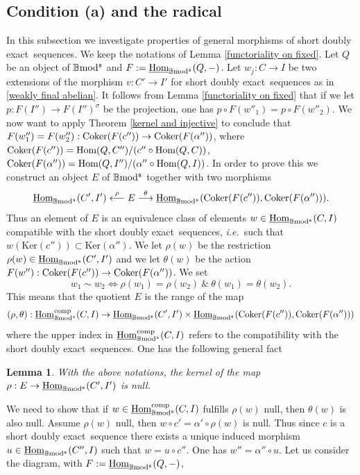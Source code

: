 \documentclass[12pt]{article}
\newtheorem{lem}[thm]{Lemma}
\def\Hom{{\rm Hom}}
\def\Homi{{\underline{\rm Hom}}}
\def\coker{{\rm Coker}}
\def\B{{\mathbb B}}
\def\exxx{{doubly exact}~}
\newcommand{\ie}{{\it i.e.\/}\ }
\def\ker{{\mbox{Ker}}}
\def\Hom {{\mbox{Hom}}}
\def\b2{{\rm \B mod^{\mathfrak s}}}
\begin{document}
\subsection{Condition (a) and the radical}\label{sect a and radical}
 In this subsection we investigate  properties of general morphisms of short \exxx sequences.
We keep the notations of Lemma \ref{functoriality on fixed}.
Let $Q$ be an object of $\b2$ and $F:=\Homi_\b2(Q,-)$.	Let $w_j:C\to I$ be two extensions  of the morphism $v:C'\to I'$ for short \exxx sequences as in \eqref{weakly final abelian}.  It follows from Lemma \ref{functoriality on fixed} that if we let $p:F(I'')\to F(I'')^\sigma$ be the projection, one has  $p\circ F(w''_1)=p\circ F(w''_2)$. We now want to apply Theorem \ref{kernel and injective} to conclude that 
$F(w''_1)=F(w''_2): \coker(F(c''))\to \coker(F(\alpha''))$, where 
$
\coker(F(c''))=\Hom(Q,C'')/(c''\circ \Hom(Q,C))$,  
$\coker(F(\alpha''))=\Hom(Q,I'')/(\alpha''\circ \Hom(Q,I))$. In order to prove this we construct an object $E$ of $\b2$ together with two morphisms 
$$
\Homi_\b2(C',I')\stackrel{\rho}{\longleftarrow} E\stackrel{\theta}{\longrightarrow}
\Homi_\b2(\coker(F(c'')),\coker(F(\alpha''))).
$$
Thus an element of $E$ is an equivalence class of elements $w\in \Homi_\b2(C,I)$ compatible with the short \exxx sequences, \ie such that $w(\ker(c''))\subset \ker(\alpha'')$. We let $\rho(w)$ be the restriction $\rho(w)\in \Homi_\b2(C',I')$ and we let $\theta(w)$ be the action $F(w''): \coker(F(c''))\to \coker(F(\alpha''))$. We set
$$
w_1\sim w_2\iff \rho(w_1)=\rho(w_2)\ \& \ \theta(w_1)=\theta(w_2).
$$
This means that the quotient $E$ is the range of the map 
\begin{equation}\label{map rho theta}
	(\rho,\theta):\Homi_\b2^{\rm comp}(C,I)\to \Homi_\b2(C',I')\times \Homi_\b2(\coker(F(c'')),\coker(F(\alpha'')))
\end{equation}
 where the upper index in $\Homi_\b2^{\rm comp}(C,I)$ refers to the compatibility with the short \exxx sequences. One has the following general fact
 \begin{lem}\label{kernel of rho} With the above notations, the kernel of the map $\rho:E\to 
 	\Homi_\b2(C',I')$ is null.
 \end{lem}
 \proof We need to show that if $w\in\Homi_\b2^{\rm comp}(C,I)$ fulfills $\rho(w)$ null, then $\theta(w)$ is also null. Assume $\rho(w)$ null, then $w\circ c'=\alpha'\circ \rho(w)$ is null. Thus since $c$ is a short \exxx sequence there exists a unique induced morphism $u\in \Homi_\b2(C'',I)$ such that $w=u\circ c''$. One has $w''=\alpha''\circ u$. Let us consider the diagram, with $F:=\Homi_\b2(Q,-)$,
\end{document}
